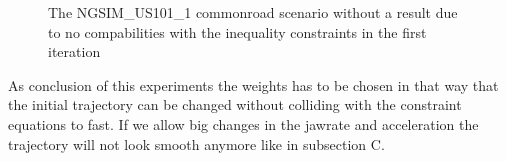 \documentclass[conference]{IEEEtran}
\begin{document}
\begin{figure}[h]
\begin{center}

\end{center}
\caption{The NGSIM\_US101\_1 commonroad scenario without a result due to no compabilities with the inequality constraints in the first iteration}
\label{11102}
\end{figure}
As conclusion of this experiments the weights has to be chosen in that way that the initial trajectory can be changed without colliding with the constraint equations to fast. If we allow big changes in the jawrate and acceleration the trajectory will not look smooth anymore like in subsection C.



%
%



%
%
\end{document}
